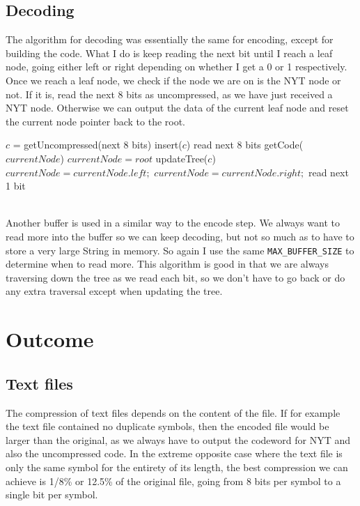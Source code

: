 \documentclass{article}
\begin{document}
\subsection{Decoding}
The algorithm for decoding was essentially the same for encoding, except for building the code. What I do is keep reading the next bit until I reach a leaf node, going either left or right depending on whether I get a 0 or 1 respectively. Once we reach a leaf node, we check if the node we are on is the NYT node or not. If it is, read the next 8 bits as uncompressed, as we have just received a NYT node. Otherwise we can output the data of the current leaf node and reset the current node pointer back to the root.\\
\begin{algorithm}
\begin{algorithmic}
    		\State $c$ = getUncompressed(next 8 bits)
    		\State insert($c$)
    		\State read next 8 bits
    	\Else
    		\State getCode($currentNode$)
    	\EndIf
    	   \State $currentNode = root$
    	   \State updateTree($c$)
    \Else
    		\State $currentNode = currentNode.left;$
    	\Else
    		\State $currentNode = currentNode.right;$
    	\EndIf
    	\State read next 1 bit
    \EndIf
\EndWhile
\end{algorithmic}
\end{algorithm}
\\Another buffer is used in a similar way to the encode step. We always want to read more into the buffer so we can keep decoding, but not so much as to have to store a very large String in memory. So again I use the same \texttt{MAX\_BUFFER\_SIZE} to determine when to read more. This algorithm is good in that we are always traversing down the tree as we read each bit, so we don't have to go back or do any extra traversal except when updating the tree.
\section{Outcome}	
\subsection{Text files}
The compression of text files depends on the content of the file. If for example the text file contained no duplicate symbols, then the encoded file would be larger than the original, as we always have to output the codeword for NYT and also the uncompressed code. In the extreme opposite case where the text file is only the same symbol for the entirety of its length, the best compression we can achieve is 1/8\% or 12.5\% of the original file, going from 8 bits per symbol to a single bit per symbol. 
\end{document}
